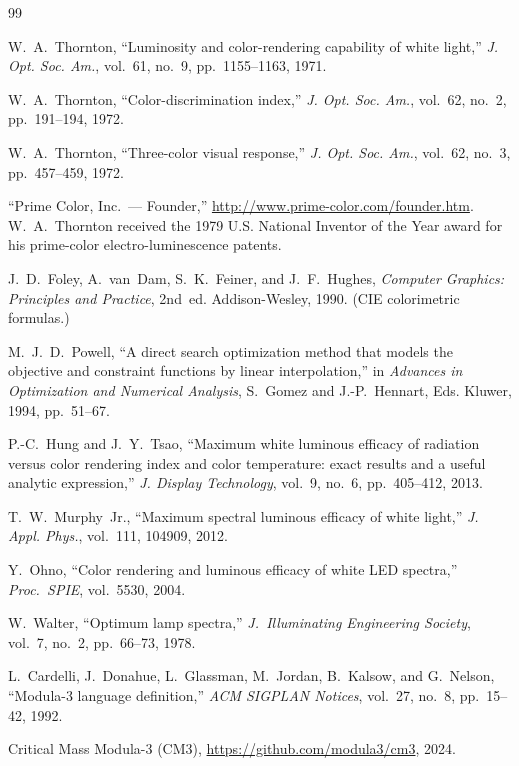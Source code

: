 \documentclass[11pt]{article}
\begin{document}
\begin{thebibliography}{99}

W.~A.~Thornton,
``Luminosity and color-rendering capability of white light,''
\emph{J. Opt. Soc. Am.}, vol.~61, no.~9, pp.~1155--1163, 1971.

W.~A.~Thornton,
``Color-discrimination index,''
\emph{J. Opt. Soc. Am.}, vol.~62, no.~2, pp.~191--194, 1972.

W.~A.~Thornton,
``Three-color visual response,''
\emph{J. Opt. Soc. Am.}, vol.~62, no.~3, pp.~457--459, 1972.

``Prime Color, Inc.\ --- Founder,'' \url{http://www.prime-color.com/founder.htm}.
W.~A.~Thornton received the 1979 U.S. National Inventor of the Year award
for his prime-color electro-luminescence patents.

J.~D.~Foley, A.~van~Dam, S.~K.~Feiner, and J.~F.~Hughes,
\emph{Computer Graphics: Principles and Practice}, 2nd~ed.
Addison-Wesley, 1990. (CIE colorimetric formulas.)

M.~J.~D.~Powell,
``A direct search optimization method that models the objective and
constraint functions by linear interpolation,''
in \emph{Advances in Optimization and Numerical Analysis},
S.~Gomez and J.-P.~Hennart, Eds. Kluwer, 1994, pp.~51--67.

P.-C.~Hung and J.~Y.~Tsao,
``Maximum white luminous efficacy of radiation versus color rendering index
and color temperature: exact results and a useful analytic expression,''
\emph{J. Display Technology}, vol.~9, no.~6, pp.~405--412, 2013.

T.~W.~Murphy~Jr.,
``Maximum spectral luminous efficacy of white light,''
\emph{J. Appl. Phys.}, vol.~111, 104909, 2012.

Y.~Ohno,
``Color rendering and luminous efficacy of white LED spectra,''
\emph{Proc.\ SPIE}, vol.~5530, 2004.

W.~Walter,
``Optimum lamp spectra,''
\emph{J.\ Illuminating Engineering Society}, vol.~7, no.~2, pp.~66--73,
1978.

L.~Cardelli, J.~Donahue, L.~Glassman, M.~Jordan, B.~Kalsow, and
G.~Nelson,
``Modula-3 language definition,''
\emph{ACM SIGPLAN Notices}, vol.~27, no.~8, pp.~15--42, 1992.

Critical Mass Modula-3 (CM3),
\url{https://github.com/modula3/cm3}, 2024.


\end{thebibliography}
\end{document}
